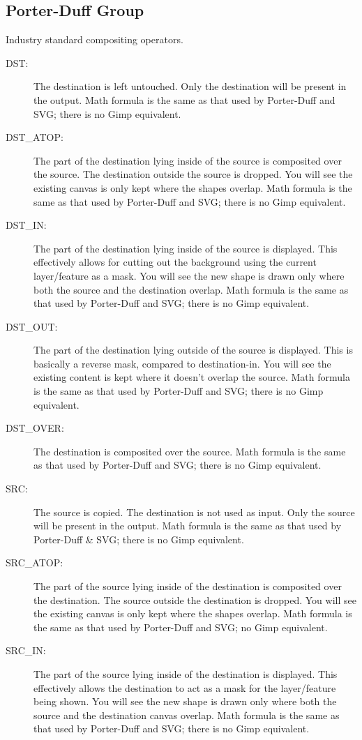 \subsection*{Porter-Duff Group}%
\label{sub:porter-duff_group}

Industry standard compositing operators.

\begin{description}
    \item[DST:] The destination is left untouched.  Only the destination will be present in the output.  Math formula is the same as that used by Porter-Duff and SVG; there is no Gimp equivalent.
    \item[DST\_ATOP:] The part of the destination lying inside of the source is composited over the source.  The destination outside the source is dropped.  You will see the existing canvas is only kept where the shapes overlap.  Math formula is the same as that used by Porter-Duff and SVG; there is no Gimp equivalent.
    \item[DST\_IN:] The part of the destination lying inside of the source is displayed.  This effectively allows for cutting out the background using the current layer/feature as a mask.  You will see the new shape is drawn only where both the source and the destination overlap.  Math formula is the same as that used by Porter-Duff and SVG; there is no Gimp equivalent.
    \item[DST\_OUT:] The part of the destination lying outside of the source is displayed.  This is basically a reverse mask, compared to destination-in.  You will see the existing content is kept where it doesn't overlap the source.  Math formula is the same as that used by Porter-Duff and SVG; there is no Gimp equivalent.
    \item[DST\_OVER:] The destination is composited over the source.  Math formula is the same as that used by Porter-Duff and SVG; there is no Gimp equivalent.
    \item[SRC:] The source is copied.  The destination is not used as input.  Only the source will be present in the output.  Math formula is the same as that used by Porter-Duff \& SVG; there is no Gimp equivalent.
    \item[SRC\_ATOP:] The part of the source lying inside of the destination is composited over the destination. The source outside the destination is dropped.  You will see the existing canvas is only kept where the shapes overlap.  Math formula is the same as that used by Porter-Duff and SVG; no Gimp equivalent.
    \item[SRC\_IN:] The part of the source lying inside of the destination is displayed.  This effectively allows the destination to act as a mask for the layer/feature being shown.  You will see the new shape is drawn only where both the source and the destination canvas overlap.  Math formula is the same as that used by Porter-Duff and SVG; there is no Gimp equivalent.

\end{description}
